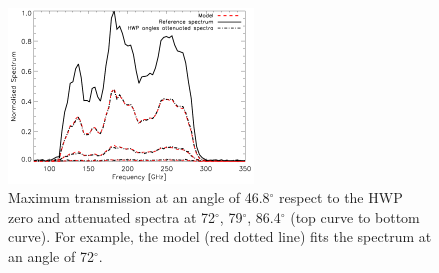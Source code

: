 \documentclass[twocolumn,traditabstract]{aa}
\begin{document}
{%

 

\begin{figure}[t!]
  \begin{center}
    \includegraphics[width=6.5cm, keepaspectratio]{figures/spectre}
    \caption{ Maximum transmission at an angle of 46.8$^{\circ}$
      respect to the HWP zero and attenuated spectra at 72$^{\circ}$,
      79$^{\circ}$, 86.4$^{\circ}$ (top curve to bottom curve). For example, the
      model (red dotted line) fits the spectrum at an angle of 72$^{\circ}$.}
    \label{fig:spectre}
  \end{center}
\end{figure}
		

}
\end{document}
